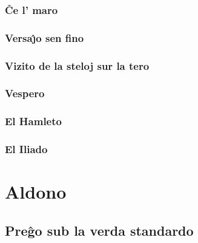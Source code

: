 \documentclass[a5paper,11pt,openany,twoside]{book}
\begin{document}
\subsection{\^Ce l' maro}
\label{maro}


\subsection{Versa\^{\j}o sen fino}
\label{senfino}

\subsection{Vizito de la steloj sur la tero}
\label{vizito}


\subsection{Vespero}
\label{vespero}


\newpage %

\subsection{El Hamleto}
\label{hamleto}


\subsection{El Iliado}
\label{iliado}


%
%
\chapter{Aldono}
\section{Pre\^go sub la verda standardo}
\label{standardo}


\newpage

%
%

\end{document}
